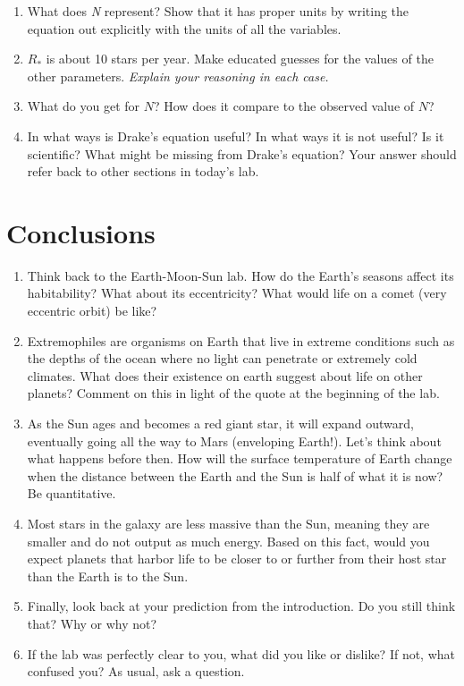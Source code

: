 \documentclass[12pt]{article}%
\begin{document}
\begin{enumerate}

\item  What does \emph{N} represent?  
Show that it has proper units by writing the equation out explicitly with the units of all the variables.

\item  $R_{*}$ is about 10 stars per year.  
Make educated guesses for the values of the other parameters.  \emph{Explain your reasoning in each case.}

\item  What do you get for $N$?  How does it compare to the observed value of $N$?

\item In what ways is Drake's equation useful?  
In what ways it is not useful?  Is it scientific?  
What might be missing from Drake's equation?  
Your answer should refer back to other sections in today's lab.

\end{enumerate}


\section{Conclusions}

\begin{enumerate}

\item Think back to the Earth-Moon-Sun lab. How do the Earth's seasons affect its habitability? What about its eccentricity? What would life on a comet (very eccentric orbit) be like? 

\item Extremophiles are organisms on Earth that live in extreme conditions such as the depths of the ocean where no light can penetrate or extremely cold climates.  
What does their existence on earth suggest about life on other planets?  
Comment on this in light of the quote at the beginning of the lab.

\item As the Sun ages and becomes a red giant star, it will expand outward, eventually going all the way to Mars (enveloping Earth!).  
Let's think about what happens before then.  
How will the surface temperature of Earth change when the distance between the Earth and the Sun is half of what it is now? Be quantitative.

\item Most stars in the galaxy are less massive than the Sun, meaning they are smaller and do not output as much energy. 
Based on this fact, would you expect planets that harbor life to be closer to or further from their host star than the Earth is to the Sun.

\item Finally, look back at your prediction from the introduction. Do you still think that? Why or why not?

\item If the lab was perfectly clear to you, what did you like or dislike? 
If not, what confused you? As usual, ask a question. 
\end{enumerate}
\end{document}
